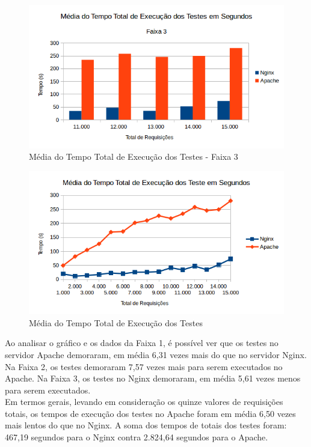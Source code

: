 \begin{figure}[H]
	\centering
	\includegraphics[width=1\linewidth]{graficos/grafico1-f3} 
	\caption{Média do Tempo Total de Execução dos Testes - Faixa 3}
	\label{fig:grafico1-f3}
\end{figure}

\begin{figure}[H]
	\centering
	\includegraphics[width=1\linewidth]{graficos/grafico1} 
	\caption{Média do Tempo Total de Execução dos Testes}
	\label{fig:grafico1}
\end{figure}
Ao analisar o gráfico e os dados da Faixa 1, é possível ver que os testes no 
servidor Apache demoraram, em média 6,31 vezes mais do que no servidor Nginx. 
Na Faixa 2, os testes demoraram 7,57 vezes mais para serem executados no 
Apache. Na Faixa 3, os testes no Nginx demoraram, em média 5,61 vezes menos 
para serem executados.\\
Em termos gerais, levando em consideração os quinze valores de requisições 
totais, os tempos de execução dos testes no Apache foram em média 6,50 vezes 
mais lentos do que no Nginx. A soma dos tempos de totais dos testes foram: 
467,19 segundos para o Nginx contra 2.824,64 segundos para o Apache.

